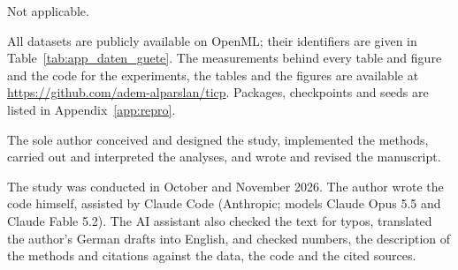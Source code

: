 \documentclass[pdflatex,sn-mathphys-num]{sn-jnl}
\begin{document}
 Not applicable.

 All datasets are publicly available on
OpenML; their identifiers are given in Table~\ref{tab:app_daten_guete}.
The measurements behind every table and figure and the code for the
experiments, the tables and the figures are available at \url{https://github.com/adem-alparslan/ticp}.
Packages, checkpoints and seeds are listed in Appendix~\ref{app:repro}.

 The sole author conceived and designed the study, implemented the methods, carried out and interpreted the analyses, and wrote and revised the manuscript.

 The study was conducted in October and November 2026. The author wrote the code himself, assisted by Claude Code (Anthropic; models Claude Opus 5.5 and Claude Fable 5.2). The AI assistant also checked the text for typos, translated the author’s German drafts into English, and checked numbers, the description of the methods and citations against the data, the code and the cited sources.

\hypersetup{bookmarksdepth=5}
\newcommand{\nurde}[1]{}
\begin{appendices}

\end{appendices}
\end{document}
